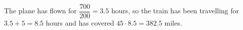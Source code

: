 The plane has flown for $\dfrac{700}{200}=3.5$ hours, so the train has been travelling for $3.5+5=8.5$ hours and has covered $45\cdot8.5=\boxed{382.5}$ miles.
